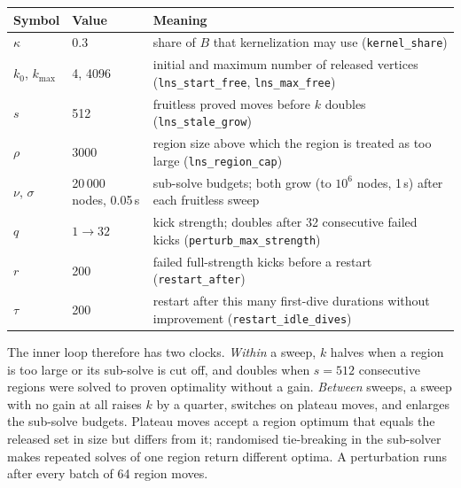 \documentclass[pdflatex,sn-mathphys-num]{sn-jnl}
\theoremstyle{thmstyleone}%
\theoremstyle{thmstyletwo}%
\renewenvironment{table}[1][]{\begin{tableorg}[#1]\begin{center}\tablebodyfont}{\end{center}\end{tableorg}}
\begin{document}
\begin{table}[htbp]
\centering
\caption{Parameters of Algorithm~\ref{alg:cascade} and their values in every
experiment (no per-family tuning). All are named by their flag in the
implementation.}
\label{tab:params}
\small
\begin{tabular}{llp{7.2cm}}
\toprule
Symbol & Value & Meaning \\
\midrule
$\kappa$ & 0.3 & share of $B$ that kernelization may use (\texttt{kernel\_share}) \\
$k_0$, $k_{\max}$ & 4, 4096 & initial and maximum number of released vertices (\texttt{lns\_start\_free}, \texttt{lns\_max\_free}) \\
$s$ & 512 & fruitless proved moves before $k$ doubles (\texttt{lns\_stale\_grow}) \\
$\rho$ & 3000 & region size above which the region is treated as too large (\texttt{lns\_region\_cap}) \\
$\nu$, $\sigma$ & 20\,000 nodes, 0.05\,s & sub-solve budgets; both grow (to $10^6$ nodes, 1\,s) after each fruitless sweep \\
$q$ & $1\to 32$ & kick strength; doubles after 32 consecutive failed kicks (\texttt{perturb\_max\_strength}) \\
$r$ & 200 & failed full-strength kicks before a restart (\texttt{restart\_after}) \\
$\tau$ & 200 & restart after this many first-dive durations without improvement (\texttt{restart\_idle\_dives}) \\
\bottomrule
\end{tabular}
\end{table}

The inner loop therefore has two clocks. \emph{Within} a sweep, $k$ halves when
a region is too large or its sub-solve is cut off, and doubles when $s=512$
consecutive regions were solved to proven optimality without a gain. \emph{Between}
sweeps, a sweep with no gain at all raises $k$ by a quarter, switches on
plateau moves, and enlarges the sub-solve budgets. Plateau moves accept a region
optimum that equals the released set in size but differs from it; randomised
tie-breaking in the sub-solver makes repeated solves of one region return
different optima. A perturbation runs after every batch of 64 region moves.
\end{document}

